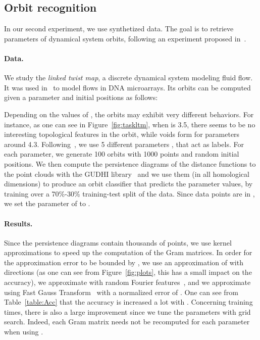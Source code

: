 \documentclass[11pt]{article}
\begin{document}
\subsection{Orbit recognition}\label{sec:expeorbit}

In our second experiment, we use synthetized data.
The goal is to retrieve parameters of dynamical system orbits,
following an experiment proposed in~\cite{Adams17}.

\paragraph*{Data.} We study the {\em linked twist map}, a discrete dynamical system modeling
fluid flow. It was used in~\cite{Hertzsch07} to model flows in DNA microarrays.
Its orbits can be computed given a parameter  and
initial positions  as follows:



Depending on the values of , the orbits may exhibit very different behaviors. For instance,
as one can see in Figure~\ref{fig:taskltm}, when  is 3.5, there seems to be no interesting topological features
in the orbit, while voids form for  parameters around 4.3.
Following~\cite{Adams17}, we use 5 different parameters , that act as labels.
For each parameter, we generate 100 orbits with 1000 points and random initial positions. We then compute
the persistence diagrams of the distance functions to the point clouds with the GUDHI library~\cite{gudhi} and we use them (in all homological dimensions) 
to produce an orbit classifier
that predicts the parameter values, by training over a 70\%-30\% training-test split of the data.
Since data points are in , we set the  parameter of  to . \\

\paragraph*{Results.} Since the persistence diagrams contain thousands of points, we use kernel approximations
to speed up the computation of the Gram matrices.
In order for the approximation error to be bounded by , 
we use an approximation of  with  directions (as one can see from Figure~\ref{fig:plots}, 
this has a small impact on the accuracy), we approximate  with  random Fourier features~\cite{Rahimi08},
and we approximate  using Fast Gauss Transform~\cite{Morariu09}
with a normalized error of . 
One can see from Table~\ref{table:Acc} that the accuracy is increased a lot with .
Concerning training times, there is also a large improvement since we tune the parameters with grid search. 
Indeed, each Gram matrix needs not be recomputed for each parameter when using .
\end{document}
